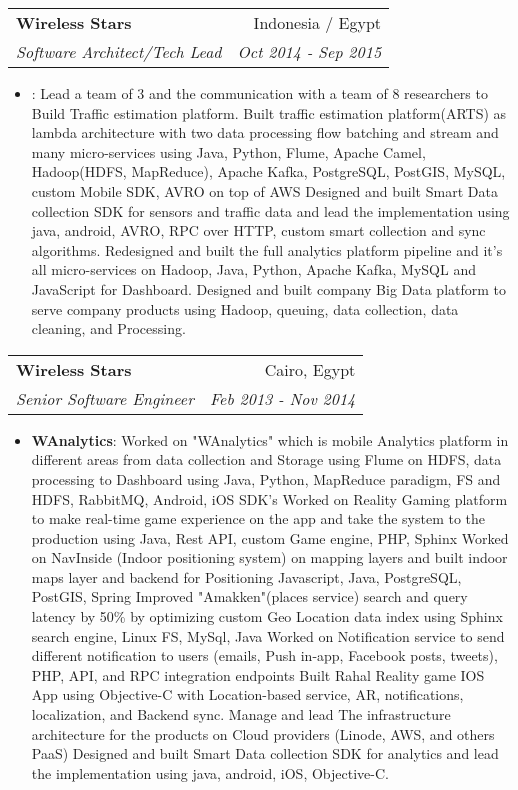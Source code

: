 \documentclass[letterpaper,11pt]{article}
\makeatletter
\newcommand{\resumeItem}[2]{
  \item\small{
    \textbf{#1}{: #2 \vspace{-2pt}}
  }
}
\newcommand{\resumeSubheading}[4]{
  \vspace{-1pt}\item
    \begin{tabular*}{0.97\textwidth}{l@{\extracolsep{\fill}}r}
      \textbf{#1} & #2 \\
      \textit{\small#3} & \textit{\small #4} \\
    \end{tabular*}\vspace{-5pt}
}
\newcommand{\resumeItemListStart}{\begin{itemize}}
\newcommand{\resumeItemListEnd}{\end{itemize}\vspace{-5pt}}
\makeatother
\begin{document}
    \resumeSubheading
      {Wireless Stars}{Indonesia / Egypt}
      {Software Architect/Tech Lead}{Oct 2014 - Sep 2015}
      \resumeItemListStart
        \resumeItem{}
{Lead a team of 3 and the communication with a team of 8 researchers to Build Traffic estimation platform.
Built traffic estimation platform(ARTS) as lambda architecture with two data processing flow batching and stream and many micro-services using Java, Python, Flume, Apache Camel, Hadoop(HDFS, MapReduce), Apache Kafka, PostgreSQL, PostGIS, MySQL, custom Mobile SDK, AVRO on top of AWS
Designed and built Smart Data collection SDK for sensors and traffic data and lead the implementation using java, android, AVRO, RPC over HTTP, custom smart collection and sync algorithms. 
Redesigned and built the full analytics platform pipeline and it's all micro-services on Hadoop, Java, Python, Apache Kafka, MySQL and  JavaScript for Dashboard.
Designed and built company Big Data platform to serve company products using Hadoop, queuing, data collection, data cleaning, and Processing.}
      \resumeItemListEnd

    \resumeSubheading
      {Wireless Stars}{Cairo, Egypt}
      {Senior Software Engineer}{Feb 2013 - Nov 2014}
      \resumeItemListStart
        \resumeItem{WAnalytics}
                  {Worked on "WAnalytics"  which is mobile Analytics platform in different areas from data collection and Storage using Flume on HDFS, data processing to Dashboard using Java, Python, MapReduce paradigm, FS and HDFS, RabbitMQ, Android, iOS SDK's
          Worked on Reality Gaming platform to make real-time game experience on the app and take the system to the production using Java, Rest API, custom Game engine, PHP, Sphinx
          Worked on NavInside (Indoor positioning system) on mapping layers and built indoor maps layer and backend for Positioning Javascript, Java, PostgreSQL, PostGIS, Spring
          Improved "Amakken"(places service) search and query latency by 50\% by optimizing  custom Geo Location data index using Sphinx search engine, Linux FS, MySql, Java
          Worked on Notification service to send different notification to users (emails, Push in-app, Facebook posts, tweets), PHP, API, and RPC integration endpoints
          Built Rahal Reality game IOS App using Objective-C with Location-based service, AR, notifications, localization, and Backend sync.
          Manage and lead The infrastructure architecture for the products on Cloud providers (Linode, AWS, and others PaaS)
          Designed and built Smart Data collection SDK for analytics and lead the implementation using java, android, iOS, Objective-C.}
      \resumeItemListEnd
\end{document}
